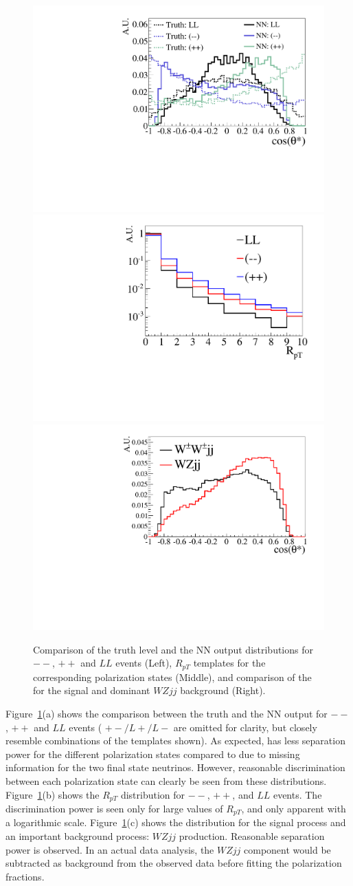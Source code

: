 \begin{figure}
\includegraphics[width=.32\textwidth,height=.18\textheight]{./fig/1d_templates_graph_X.pdf}
\includegraphics[width=.32\textwidth,height=.18\textheight]{./fig/ratios_LLRROO_graph.pdf}
\includegraphics[width=.32\textwidth,height=.18\textheight]{./fig/1d_wz_bg_graph_X.pdf}
\caption{\label{fig:polarization_comparison} Comparison of the truth level \cts and the 
NN output \ctsNN distributions for $--$, $++$ and $LL$ events (Left), 
$R_{pT}$ templates for the corresponding polarization states (Middle), 
and comparison of the \ctsNN for the signal and dominant $WZjj$ background (Right).}
\end{figure}

Figure~\ref{fig:polarization_comparison}(a) shows the comparison between the truth \cts and 
the NN output \ctsNN for $--$, $++$ and $LL$ events ( $+-/L+/L-$ are omitted for clarity, but closely resemble combinations of the templates shown). As expected, \ctsNN has less separation 
power for the different polarization states compared to \cts due to missing information for the two final state neutrinos. 
However, reasonable discrimination between each polarization state can clearly be seen from these distributions. 
Figure~\ref{fig:polarization_comparison}(b) shows the $R_{pT}$ distribution for $--$, $++$, and $LL$ events. 
The discrimination power is seen only for large values of $R_{pT}$, and only apparent with a logarithmic scale. Figure~\ref{fig:polarization_comparison}(c) shows the \ctsNN distribution for the signal \ssWW process and an important background process: $WZjj$ production.  Reasonable separation power is observed. In an actual data analysis, the $WZjj$ component would be subtracted as background
from the observed data before fitting the polarization fractions.


